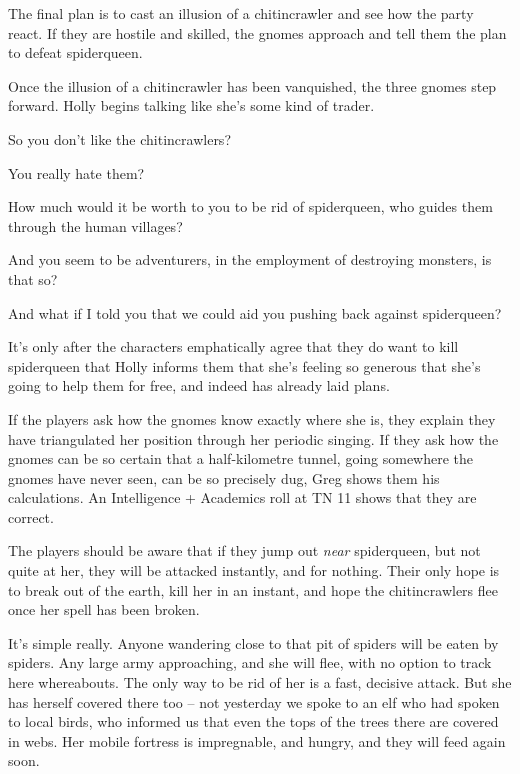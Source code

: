 \begin{multicols}{2}
The final plan is to cast an illusion of a chitincrawler and see how the party react.  If they are hostile and skilled, the gnomes approach and tell them the plan to defeat \gls{spiderqueen}.

Once the illusion of a chitincrawler has been vanquished, the three gnomes step forward.
Holly begins talking like she's some kind of trader.

\begin{speechtext}

	So you don't like the chitincrawlers?

	You really hate them?

	How much would it be worth to you to be rid of \gls{spiderqueen}, who guides them through the human villages?

	And you seem to be adventurers, in the employment of destroying monsters, is that so?

	And what if I told you that we could aid you pushing back against \gls{spiderqueen}?

\end{speechtext}

It's only after the characters emphatically agree that they do want to kill \gls{spiderqueen} that Holly informs them that she's feeling so generous that she's going to help them for free, and indeed has already laid plans.

If the players ask how the gnomes know exactly where she is, they explain they have triangulated her position through her periodic singing.  If they ask how the gnomes can be so certain that a half-kilometre tunnel, going somewhere the gnomes have never seen, can be so precisely dug, Greg shows them his calculations.  An Intelligence + Academics roll at TN 11 shows that they are correct.

The players should be aware that if they jump out \emph{near} \gls{spiderqueen}, but not quite at her, they will be attacked instantly, and for nothing.  Their only hope is to break out of the earth, kill her in an instant, and hope the chitincrawlers flee once her spell has been broken.

\begin{speechtext}

	It's simple really.  Anyone wandering close to that pit of spiders will be eaten by spiders.  Any large army approaching, and she will flee, with no option to track here whereabouts.  The only way to be rid of her is a fast, decisive attack.  But she has herself covered there too -- not yesterday we spoke to an elf who had spoken to local birds, who informed us that even the tops of the trees there are covered in webs.  Her mobile fortress is impregnable, and hungry, and they will feed again soon.


\end{speechtext}
\end{multicols}
